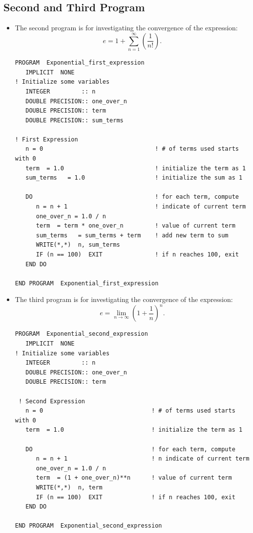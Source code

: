 \documentclass[11pt]{article}
\begin{document}
\subsection{Second and Third Program}
\begin{itemize}
\item  The second program is for investigating the convergence of the expression: 
\[
e=1+\sum_{n=1}^{\infty}\left(\frac{1}{n !}\right).
\]
\begin{verbatim}
PROGRAM  Exponential_first_expression
   IMPLICIT  NONE
! Initialize some variables  
   INTEGER         :: n         
   DOUBLE PRECISION:: one_over_n    
   DOUBLE PRECISION:: term
   DOUBLE PRECISION:: sum_terms      

! First Expression
   n = 0                                ! # of terms used starts with 0
   term  = 1.0                          ! initialize the term as 1
   sum_terms   = 1.0                    ! initialize the sum as 1

   DO                                   ! for each term, compute
      n = n + 1                         ! indicate of current term
      one_over_n = 1.0 / n
      term  = term * one_over_n         ! value of current term
      sum_terms   = sum_terms + term    ! add new term to sum
      WRITE(*,*)  n, sum_terms
      IF (n == 100)  EXIT               ! if n reaches 100, exit
   END DO

END PROGRAM  Exponential_first_expression
\end{verbatim}

\item The third program is for investigating the convergence of the expression: 
\[
e=\lim _{n \rightarrow \infty}\left(1+\frac{1}{n}\right)^{n}.
\]
\begin{verbatim}
PROGRAM  Exponential_second_expression
   IMPLICIT  NONE
! Initialize some variables  
   INTEGER         :: n         
   DOUBLE PRECISION:: one_over_n    
   DOUBLE PRECISION:: term

 ! Second Expression
   n = 0                               ! # of terms used starts with 0
   term  = 1.0                         ! initialize the term as 1
 
   DO                                  ! for each term, compute
      n = n + 1                        ! n indicate of current term
      one_over_n = 1.0 / n
      term  = (1 + one_over_n)**n      ! value of current term
      WRITE(*,*)  n, term
      IF (n == 100)  EXIT              ! if n reaches 100, exit
   END DO

END PROGRAM  Exponential_second_expression
\end{verbatim}
\end{itemize}
\end{document}
